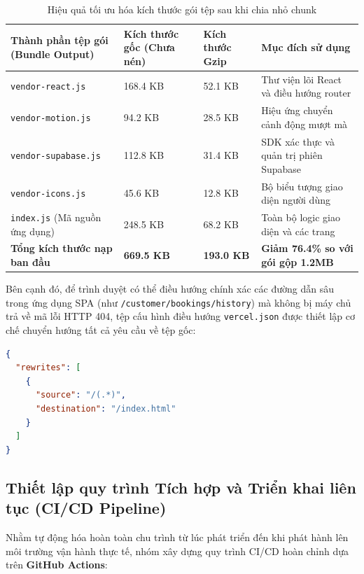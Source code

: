 \begin{table}[H]
\centering
\caption{Hiệu quả tối ưu hóa kích thước gói tệp sau khi chia nhỏ chunk}
\label{tab:bundle-optimization}
\renewcommand{\arraystretch}{1.3}
\begin{tabular}{|p{4.5cm}|p{3.2cm}|p{3.2cm}|p{3.5cm}|}
\hline
\textbf{Thành phần tệp gói (Bundle Output)} & \textbf{Kích thước gốc (Chưa nén)} & \textbf{Kích thước Gzip} & \textbf{Mục đích sử dụng} \\
\hline
\texttt{vendor-react.js} & 168.4 KB & 52.1 KB & Thư viện lõi React và điều hướng router \\
\hline
\texttt{vendor-motion.js} & 94.2 KB & 28.5 KB & Hiệu ứng chuyển cảnh động mượt mà \\
\hline
\texttt{vendor-supabase.js} & 112.8 KB & 31.4 KB & SDK xác thực và quản trị phiên Supabase \\
\hline
\texttt{vendor-icons.js} & 45.6 KB & 12.8 KB & Bộ biểu tượng giao diện người dùng \\
\hline
\texttt{index.js} (Mã nguồn ứng dụng) & 248.5 KB & 68.2 KB & Toàn bộ logic giao diện và các trang \\
\hline
\textbf{Tổng kích thước nạp ban đầu} & \textbf{669.5 KB} & \textbf{193.0 KB} & \textbf{Giảm 76.4\% so với gói gộp 1.2MB} \\
\hline
\end{tabular}
\end{table}

Bên cạnh đó, để trình duyệt có thể điều hướng chính xác các đường dẫn sâu trong ứng dụng SPA (như \texttt{/customer/bookings/history}) mà không bị máy chủ trả về mã lỗi HTTP 404, tệp cấu hình điều hướng \texttt{vercel.json} được thiết lập cơ chế chuyển hướng tất cả yêu cầu về tệp gốc:

\begin{lstlisting}[language=json, caption={Tệp cấu hình điều hướng SPA vercel.json}]
{
  "rewrites": [
    {
      "source": "/(.*)",
      "destination": "/index.html"
    }
  ]
}
\end{lstlisting}

\subsection{Thiết lập quy trình Tích hợp và Triển khai liên tục (CI/CD Pipeline)}

Nhằm tự động hóa hoàn toàn chu trình từ lúc phát triển đến khi phát hành lên môi trường vận hành thực tế, nhóm xây dựng quy trình CI/CD hoàn chỉnh dựa trên \textbf{GitHub Actions}:

